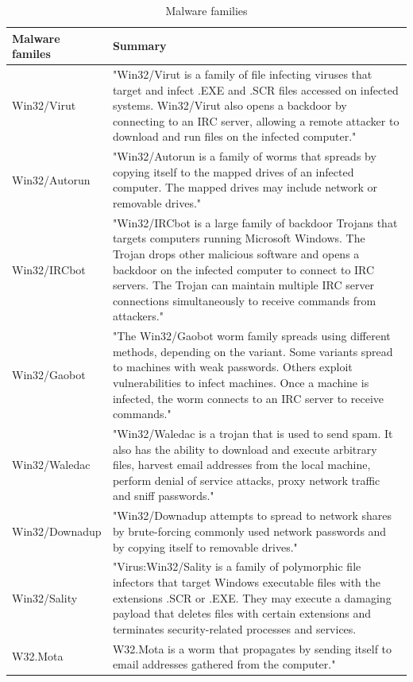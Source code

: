 \begin{center}
\begin{table}
\begin{tabular}{ l | p{13cm} }
Malware familes & Summary\\ \hline
Win32/Virut & "Win32/Virut is a family of file infecting viruses that target and infect .EXE and .SCR files accessed on infected systems.
 Win32/Virut also opens a backdoor by connecting to an IRC server, allowing a remote attacker to download and run files on the infected computer." \cite{virut}\\ \hline
Win32/Autorun & "Win32/Autorun is a family of worms that spreads by copying itself to the mapped drives of an infected computer. The mapped drives may include network or removable drives." \cite{autorun}\\\hline
Win32/IRCbot & "Win32/IRCbot is a large family of backdoor Trojans that targets computers running Microsoft Windows. The Trojan drops other malicious software and opens a backdoor on the infected computer to connect to IRC servers. The Trojan can maintain multiple IRC server connections simultaneously to receive commands from attackers." \cite{ircbot}\\ \hline
Win32/Gaobot & "The Win32/Gaobot worm family spreads using different methods, depending on the variant. Some variants spread to machines with weak passwords. Others exploit vulnerabilities to infect machines. Once a machine is infected, the worm connects to an IRC server to receive commands." \cite{gaobot}\\ \hline
Win32/Waledac & "Win32/Waledac is a trojan that is used to send spam. It also has the ability to download and execute arbitrary files, harvest email addresses from the local machine, perform denial of service attacks, proxy network traffic and sniff passwords." \cite{waledac}\\ \hline
Win32/Downadup & "Win32/Downadup attempts to spread to network shares by brute-forcing commonly used network passwords and by copying itself to removable drives." \cite{downadup}\\ \hline 
Win32/Sality & "Virus:Win32/Sality is a family of polymorphic file infectors that target Windows executable files with the extensions .SCR or .EXE. They may execute a damaging payload that deletes files with certain extensions and terminates security-related processes and services.\\ \hline 
W32.Mota & W32.Mota is a worm that propagates by sending itself to email addresses gathered from the computer." \cite{mota}\\ \hline 
\end{tabular}
\caption{Malware families}
\label{tab:malwarefamilies}
\end{table}
\end{center}

